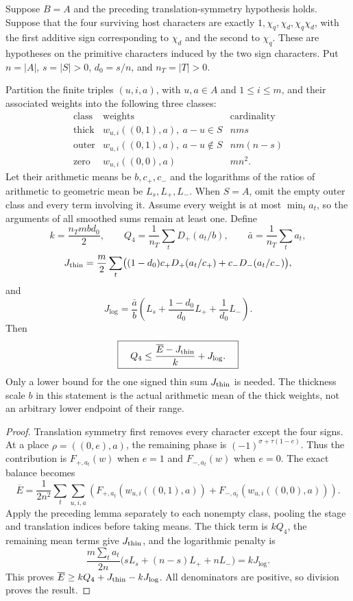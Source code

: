 \begin{proposition}
\label{cs-three-means}
Suppose $B=A$ and the preceding translation-symmetry hypothesis holds.
Suppose that the four surviving host characters are exactly
$1,\chi_q,\chi_d,\chi_q\chi_d$, with the first additive sign corresponding
to $\chi_d$ and the second to $\chi_q$. These are hypotheses on the
primitive characters induced by the two sign characters.
Put $n=|A|$, $s=|S|>0$, $d_0=s/n$, and $n_T=|T|>0$.

Partition the finite triples $(u,i,a)$, with $u,a\in A$ and $1\le i\le m$,
and their associated weights into the following three classes:
\[
 \begin{array}{c|c|c}
 \text{class}&\text{weights}&\text{cardinality}\\ \hline
 \mathrm{thick}&w_{u,i}((0,1),a),\ a-u\in S&nms\\
 \mathrm{outer}&w_{u,i}((0,1),a),\ a-u\notin S&nm(n-s)\\
 \mathrm{zero}&w_{u,i}((0,0),a)&mn^2.
 \end{array}
\]
Let their arithmetic means be $b,c_+,c_-$ and the logarithms of the
ratios of arithmetic to geometric mean be $L_s,L_+,L_-$.
When $S=A$, omit the empty outer class and every term involving it.
Assume every weight is at most $\min_t a_t$, so the arguments of all
smoothed sums remain at least one. Define
\[
 k=\frac{n_Tmbd_0}{2},\qquad
 Q_4=\frac1{n_T}\sum_tD_+(a_t/b),\qquad
 \bar a=\frac1{n_T}\sum_ta_t,
\]
\[
 J_{\rm thin}=\frac m2\sum_t
       \bigl((1-d_0)c_+D_+(a_t/c_+)+c_-D_-(a_t/c_-)\bigr),
\]
and
\[
 J_{\log}=\frac{\bar a}{b}
       \left(L_s+\frac{1-d_0}{d_0}L_++\frac1{d_0}L_-\right).
\]
Then
\[
 \boxed{\quad Q_4\le\frac{\overline E-J_{\rm thin}}k+J_{\log}.\quad}
\]
Only a lower bound for the one signed thin sum $J_{\rm thin}$ is needed.
The thickness scale $b$ in this statement is the actual arithmetic
mean of the thick weights, not an arbitrary lower endpoint of their range.
\end{proposition}
\begin{proof}
Translation symmetry first removes every character except the four
signs. At a place $\rho=((0,e),a)$, the remaining phase is
$(-1)^{\sigma+\tau(1-e)}$. Thus the contribution is $F_{+,a_t}(w)$
when $e=1$ and $F_{-,a_t}(w)$ when $e=0$. The exact balance becomes
\[
 \overline E=\frac1{2n^2}\sum_t\sum_{u,i,a}
  \left(F_{+,a_t}(w_{u,i}((0,1),a))
       +F_{-,a_t}(w_{u,i}((0,0),a))\right).
\]
Apply the preceding lemma separately to each nonempty class,
pooling the stage and translation indices before taking means.
The thick term is $kQ_4$, the remaining mean terms give $J_{\rm thin}$,
and the logarithmic penalty is
\[
 \frac{m\sum_ta_t}{2n}
       \bigl(sL_s+(n-s)L_++nL_-\bigr)=kJ_{\log}.
\]
This proves $\overline E\ge kQ_4+J_{\rm thin}-kJ_{\log}$.
All denominators are positive, so division proves the result.
\end{proof}

